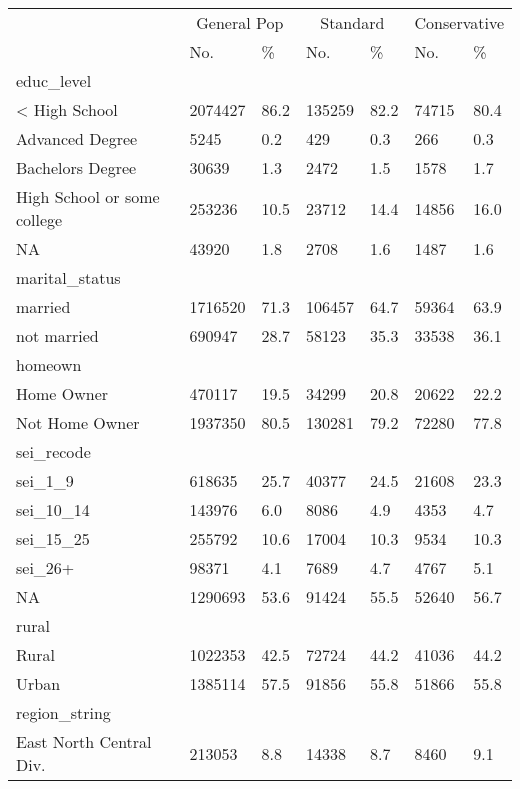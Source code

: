 \captionsetup[table]{labelformat=empty,skip=1pt}
\begin{longtable}{lllllll}
\toprule
& \multicolumn{2}{c}{General Pop} & \multicolumn{2}{c}{Standard} & \multicolumn{2}{c}{Conservative} \\ 
 \cmidrule(lr){2-3}\cmidrule(lr){4-5}\cmidrule(lr){6-7}
 & No. & \% & No. & \% & No. & \% \\ 
\midrule
\multicolumn{1}{l}{educ\_level} \\ 
\midrule
< High School & 2074427 & 86.2 & 135259 & 82.2 & 74715 & 80.4 \\ 
Advanced Degree & 5245 & 0.2 & 429 & 0.3 & 266 & 0.3 \\ 
Bachelors Degree & 30639 & 1.3 & 2472 & 1.5 & 1578 & 1.7 \\ 
High School or some college & 253236 & 10.5 & 23712 & 14.4 & 14856 & 16.0 \\ 
NA & 43920 & 1.8 & 2708 & 1.6 & 1487 & 1.6 \\ 
\midrule
\multicolumn{1}{l}{marital\_status} \\ 
\midrule
married & 1716520 & 71.3 & 106457 & 64.7 & 59364 & 63.9 \\ 
not married & 690947 & 28.7 & 58123 & 35.3 & 33538 & 36.1 \\ 
\midrule
\multicolumn{1}{l}{homeown} \\ 
\midrule
Home Owner & 470117 & 19.5 & 34299 & 20.8 & 20622 & 22.2 \\ 
Not Home Owner & 1937350 & 80.5 & 130281 & 79.2 & 72280 & 77.8 \\ 
\midrule
\multicolumn{1}{l}{sei\_recode} \\ 
\midrule
sei\_1\_9 & 618635 & 25.7 & 40377 & 24.5 & 21608 & 23.3 \\ 
sei\_10\_14 & 143976 & 6.0 & 8086 & 4.9 & 4353 & 4.7 \\ 
sei\_15\_25 & 255792 & 10.6 & 17004 & 10.3 & 9534 & 10.3 \\ 
sei\_26+ & 98371 & 4.1 & 7689 & 4.7 & 4767 & 5.1 \\ 
NA & 1290693 & 53.6 & 91424 & 55.5 & 52640 & 56.7 \\ 
\midrule
\multicolumn{1}{l}{rural} \\ 
\midrule
Rural & 1022353 & 42.5 & 72724 & 44.2 & 41036 & 44.2 \\ 
Urban & 1385114 & 57.5 & 91856 & 55.8 & 51866 & 55.8 \\ 
\midrule
\multicolumn{1}{l}{region\_string} \\ 
\midrule
East North Central Div. & 213053 & 8.8 & 14338 & 8.7 & 8460 & 9.1 \\ 

\end{longtable}
